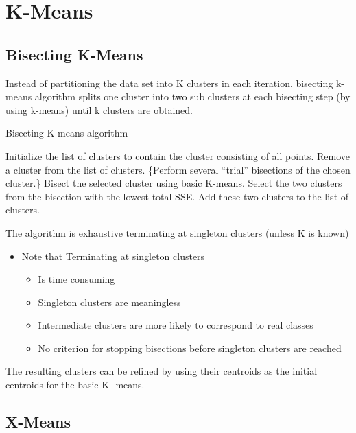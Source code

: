 \chapter{K-Means}
\label{chap:kmeans}

\section{Bisecting K-Means}
Instead of partitioning the data set into K clusters in each iteration, bisecting k-means algorithm
splits one cluster into two sub clusters at each bisecting step (by using k-means) until k clusters
are obtained.

\begin{algorithm}[H]
\caption{Bisecting K-means algorithm}
\begin{algorithmic}[1]
\State Initialize the list of clusters to contain the cluster consisting of all points.
\Repeat
\State Remove a cluster from the list of clusters.
\State \{Perform several ``trial'' bisections of the chosen cluster.\}
\State Bisect the selected cluster using basic K-means.
\EndFor
\State Select the two clusters from the bisection with the lowest total SSE.
\State Add these two clusters to the list of clusters.
\end{algorithmic}
\end{algorithm}
The algorithm is exhaustive terminating at singleton clusters (unless K is known)
\begin{itemize}
	\item Note that Terminating at singleton clusters
	\begin{itemize}
      \item Is time consuming
      \item Singleton clusters are meaningless
	   \item Intermediate clusters are more likely to correspond to real classes
	   \item No criterion for stopping bisections before singleton clusters are reached
   \end{itemize}
\end{itemize}

The resulting clusters can be refined by using their centroids as the initial centroids for the basic K- means.

\section{X-Means}

